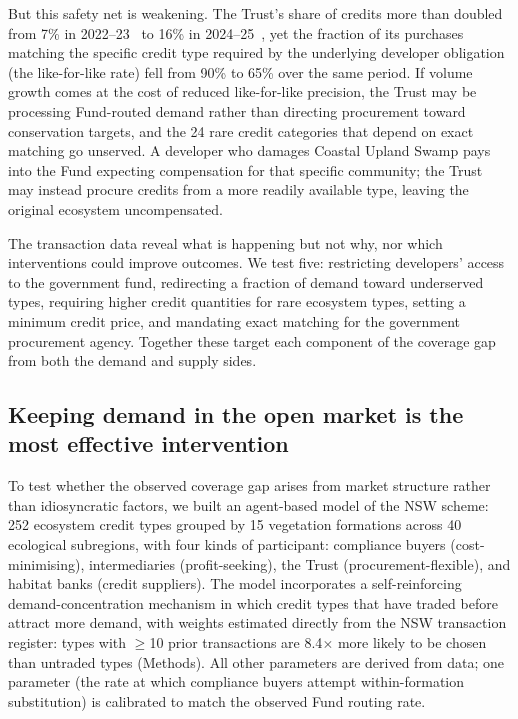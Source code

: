\documentclass[pdflatex,sn-nature,oneside]{sn-jnl}
\begin{document}
But this safety net is weakening. The Trust's share of credits more
than doubled from 7\% in 2022--23~\cite{IPART2023} to 16\% in
2024--25~\cite{IPART2025}, yet the fraction of its purchases matching
the specific credit type required by the underlying developer obligation
(the like-for-like rate) fell from 90\% to 65\% over the same period. If
volume growth comes at the cost of reduced like-for-like precision, the
Trust may be processing Fund-routed demand rather than directing
procurement toward conservation targets, and the 24 rare credit
categories that depend on exact matching go unserved. A developer who
damages Coastal Upland Swamp pays into the Fund expecting compensation
for that specific community; the Trust may instead procure credits from
a more readily available type, leaving the original ecosystem
uncompensated.

The transaction data reveal what is happening but not why, nor which
interventions could improve outcomes. We test five: restricting developers'
access to the government fund, redirecting a fraction of demand toward
underserved types, requiring higher credit quantities for rare ecosystem
types, setting a minimum credit price, and mandating exact matching for the
government procurement agency.
Together these target each component of the coverage gap from both the
demand and supply sides.

\subsection*{Keeping demand in the open market is the most effective intervention}

To test whether the observed coverage gap arises from market structure
rather than idiosyncratic factors, we built an agent-based model of the
NSW scheme: 252 ecosystem credit types grouped by 15 vegetation formations
across 40 ecological subregions, with four kinds of participant:
compliance buyers (cost-minimising), intermediaries (profit-seeking), the
Trust (procurement-flexible), and habitat banks (credit suppliers). The
model incorporates a self-reinforcing demand-concentration mechanism in
which credit types that have traded before attract more demand, with
weights estimated directly from the NSW transaction register: types
with $\geq$10 prior transactions are 8.4$\times$ more likely to be chosen
than untraded types (Methods). All other parameters are derived from
data; one parameter (the rate at which compliance buyers attempt
within-formation substitution) is calibrated to match the observed Fund
routing rate.
\end{document}
